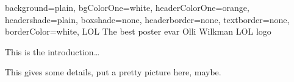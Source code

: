 \documentclass[portrait, a0paper]{baposter}
\begin{document}
	\begin{poster}
		{%
		background=plain,
		bgColorOne=white,
		headerColorOne=orange,
		headershade=plain,
		boxshade=none,
		headerborder=none,
		textborder=none,
		borderColor=white,
		} 
		{LOL} %
		{The best poster evar} %
		{Olli Wilkman} %
		{LOL} logo
		
			{This is the introduction\ldots}
			
			{This gives some details, put a pretty picture here, maybe.}
		

		
	\end{poster}
\end{document}
